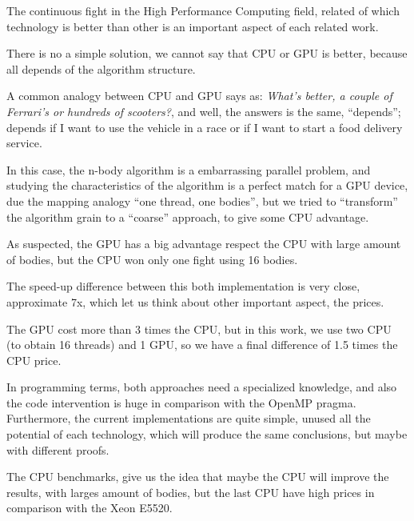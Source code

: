The continuous fight in the High Performance Computing field,
related of which technology is better than other is an important aspect
of each related work.

There is no a simple solution,
we cannot say that CPU or GPU is better,
because all depends of the algorithm structure.

A common analogy between CPU and GPU
says as: \emph{What's better, a couple of Ferrari's or hundreds of scooters?},
and well, the answers is the same, ``depends'';
depends if I want to use the vehicle in a race or if I want to
start a food delivery service.

In this case,
the n-body algorithm is a embarrassing parallel problem,
and studying the characteristics of the algorithm
is a perfect match for a GPU device,
due the mapping analogy ``one thread, one bodies'',
but we tried to ``transform'' the algorithm grain
to a ``coarse'' approach, to give some CPU advantage.

As suspected,
the GPU has a big advantage respect the CPU with large
amount of bodies, but the CPU won only one fight using
16 bodies.

The speed-up difference between this both implementation
is very close, approximate 7x, which let us think about
other important aspect, the prices.

The GPU cost more than 3 times the CPU,
but in this work, we use two CPU (to obtain 16 threads)
and 1 GPU, so we have a final difference of 1.5 times
the CPU price.

In programming terms,
both approaches need a specialized knowledge,
and also the code intervention is huge
in comparison with the OpenMP pragma.
Furthermore, the current implementations
are quite simple, unused all the potential of
each technology, which will produce
the same conclusions, but maybe with different proofs.

The CPU benchmarks,
give us the idea that maybe the CPU will improve
the results, with larges amount of bodies,
but the last CPU have high prices
in comparison with the Xeon E5520.
